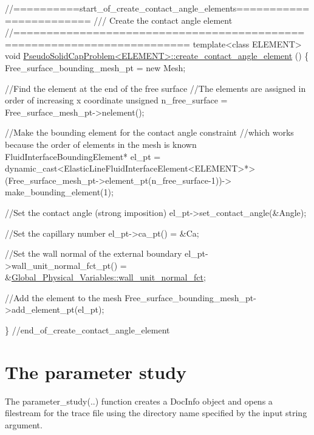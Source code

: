 \begin{DoxyCodeInclude}

\textcolor{comment}{//==========start\_of\_create\_contact\_angle\_elements========================}\textcolor{comment}{}
\textcolor{comment}{/// Create the contact angle element}
\textcolor{comment}{}\textcolor{comment}{//========================================================================}
\textcolor{keyword}{template}<\textcolor{keyword}{class} ELEMENT>
\textcolor{keywordtype}{void} \hyperlink{classPseudoSolidCapProblem_a8f28ebf09bc66142725139291b4e21a0}{PseudoSolidCapProblem<ELEMENT>::create\_contact\_angle\_element}
      ()
\{
 Free\_surface\_bounding\_mesh\_pt = \textcolor{keyword}{new} Mesh;

 \textcolor{comment}{//Find the element at the end of the free surface}
 \textcolor{comment}{//The elements are assigned in order of increasing x coordinate}
 \textcolor{keywordtype}{unsigned} n\_free\_surface = Free\_surface\_mesh\_pt->nelement();
  
 \textcolor{comment}{//Make the bounding element for the contact angle constraint}
 \textcolor{comment}{//which works because the order of elements in the mesh is known}
 FluidInterfaceBoundingElement* el\_pt = 
  \textcolor{keyword}{dynamic\_cast<}ElasticLineFluidInterfaceElement<ELEMENT>*\textcolor{keyword}{>} 
  (Free\_surface\_mesh\_pt->element\_pt(n\_free\_surface-1))->
  make\_bounding\_element(1);
 
 \textcolor{comment}{//Set the contact angle (strong imposition)}
 el\_pt->set\_contact\_angle(&Angle);
 
 \textcolor{comment}{//Set the capillary number}
 el\_pt->ca\_pt() = &Ca;
 
 \textcolor{comment}{//Set the wall normal of the external boundary}
 el\_pt->wall\_unit\_normal\_fct\_pt() 
  =  &\hyperlink{namespaceGlobal__Physical__Variables_a0d48e8726fa485de2b2df2d5031ec41b}{Global\_Physical\_Variables::wall\_unit\_normal\_fct};

 \textcolor{comment}{//Add the element to the mesh}
 Free\_surface\_bounding\_mesh\_pt->add\_element\_pt(el\_pt);

\} \textcolor{comment}{//end\_of\_create\_contact\_angle\_element}

\end{DoxyCodeInclude}
\hypertarget{index_parameter}{}\section{The parameter study}\label{index_parameter}
The {\ttfamily parameter\+\_\+study}(..) function creates a {\ttfamily Doc\+Info} object and opens a filestream for the trace file using the directory name specified by the input string argument.



